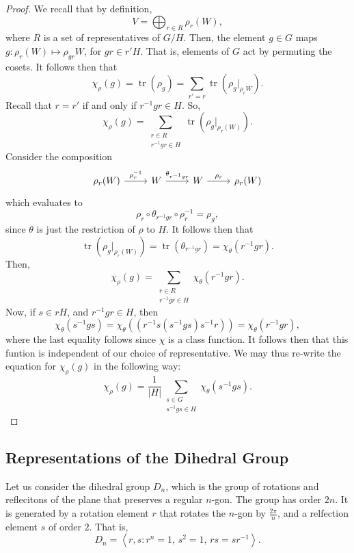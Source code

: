 \documentclass[a4paper]{report}
\theoremstyle{definition}
\theoremstyle{remark}
\theoremstyle{proposition}
\theoremstyle{conjecture}
\theoremstyle{lemma}
\theoremstyle{corollary}
\theoremstyle{exercise}
\theoremstyle{example}
\newcommand{\on}{\operatorname}
\begin{document}
\begin{proof}
    We recall that by definition, $$V = \bigoplus_{r \in R} \rho_r(W),$$
    where $R$ is a set of representatives of $G/H$. Then, the element 
    $g\in G$ maps $g : \rho_r(W) \mapsto \rho_{gr}W$, 
    for $gr \in r'H$. That is, elements of $G$ act by permuting the cosets.
    It follows then that 
    $$\chi_\rho(g) = \on{tr}(\rho_g) = \sum_{r' = r} \on{tr}\left(\rho_g\vert_{\rho_rW}\right).$$
    Recall that $r=r'$ if and only if $r^{-1}gr \in H$. So,
    $$\chi_\rho(g) = \sum_{\substack{r\in R\\r^{-1}gr\in H}} \on{tr}\left(\rho_g\vert_{\rho_r(W)}\right).$$
    Consider the composition 
    $$\begin{tikzcd}
\rho_r(W) \arrow[r, "\rho_r^{-1}"] & W \arrow[r, "\theta_{r^{-1}gr}"] & W \arrow[r, "\rho_r"] & \rho_r(W)
\end{tikzcd}$$
    which evaluates to 
    $$\rho_r\circ \theta_{r^{-1}gr}\circ \rho_r^{-1} = \rho_g,$$
    since $\theta$ is just the restriction of $\rho$ to $H$.
    It follows then that 
    $$\on{tr}(\rho_g\vert_{\rho_r(W)}) = \on{tr}(\theta_{r^{-1}gr}) = \chi_\theta(r^{-1}gr).$$
    Then,
    $$\chi_\rho(g) = \sum_{\substack{r\in R\\r^{-1}gr\in H}} \chi_\theta(r^{-1}gr).$$
    Now, if $s\in rH$, and $r^{-1}gr \in H$, then 
    $$\chi_\theta(s^{-1}gs) =\chi_\theta\left( (r^{-1}s(s^{-1}gs)s^{-1}r)\right)= \chi_\theta(r^{-1}gr),$$
    where the last equality follows since $\chi$ is a class function.
    It follows then that this funtion is independent of our choice of 
    representative. We may thus re-write the equation for $\chi_\rho(g)$
    in the following way:
    $$\chi_\rho (g) = \frac{1}{\vert H\vert} \sum_{\substack{s\in G\\s^{-1}gs\in H}} \chi_\theta(s^{-1}gs).$$
\end{proof}

\subsection{Representations of the Dihedral Group}

Let us consider the dihedral group $D_n$, which is the group of 
rotations and reflecitons of the plane that preserves a
regular $n$-gon. The group has order $2n$. 
It is generated by a rotation element $r$ that rotates the $n$-gon
by $\frac{2\pi}{n}$, and a relfection
element $s$ of order $2$. That is, 
$$D_n = \left\langle r,s : \text{$r^n = 1$, $s^2 = 1$, $rs = sr^{-1}$} \right\rangle.$$
\end{document}
